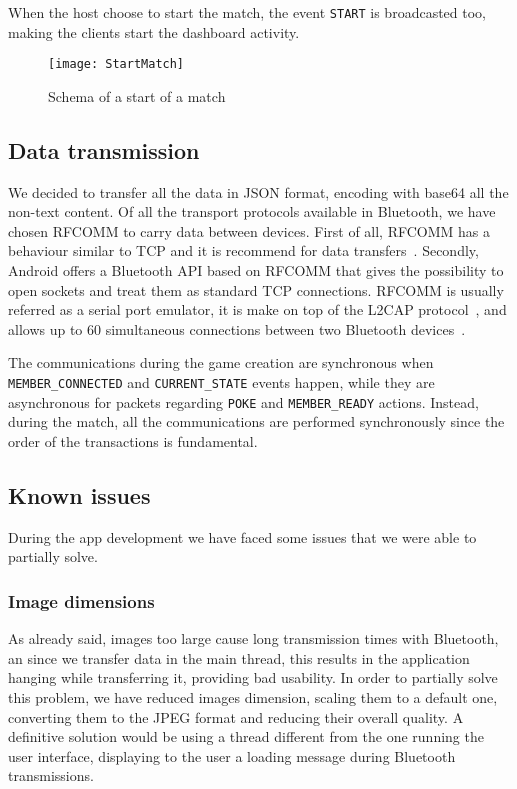 When the host choose to start the match, the event \texttt{START} is 
broadcasted too, making the clients start the dashboard activity.

\begin{figure}[t]
 \centering
 \texttt{[image: StartMatch]}
 \caption{Schema of a start of a match}
 \label{fig:gbStartMatch}
\end{figure}

\subsection{Data transmission}

We decided to transfer all the data in JSON format, encoding with base64 all the
non-text content.
Of all the transport protocols available in Bluetooth, we have chosen RFCOMM to 
carry data between devices. First of all, RFCOMM has a behaviour similar to TCP 
and it is recommend for data transfers~\cite{bisdikian01}. Secondly, Android 
offers a Bluetooth API based on RFCOMM that gives the possibility to open 
sockets and treat them as standard TCP connections.
RFCOMM is usually referred as a serial port emulator, it is make on top of 
the L2CAP protocol~\cite{bisdikian01}, and allows up to 60 simultaneous 
connections between two Bluetooth devices~\cite{aneesh12}.

The communications during the game creation are synchronous when 
\texttt{MEMBER\_CONNECTED} and \texttt{CURRENT\_STATE} events happen, while 
they are asynchronous for packets regarding \texttt{POKE} 
and \texttt{MEMBER\_READY} actions. Instead, during the match, all the 
communications are performed synchronously since the order of the transactions 
is fundamental.

\subsection{Known issues}

During the app development we have faced some issues that we were able to 
partially solve.

\subsubsection{Image dimensions}

As already said, images too large cause long transmission times with Bluetooth, 
an since we transfer data  in the main thread, this results in the application 
hanging while transferring it, providing bad usability. In order to partially 
solve this problem, we have reduced images dimension, scaling them to a default 
one, converting them to the JPEG format and reducing their overall quality. A 
definitive solution would be using a thread different from the one running the 
user interface, displaying to the user a loading message during Bluetooth 
transmissions.

